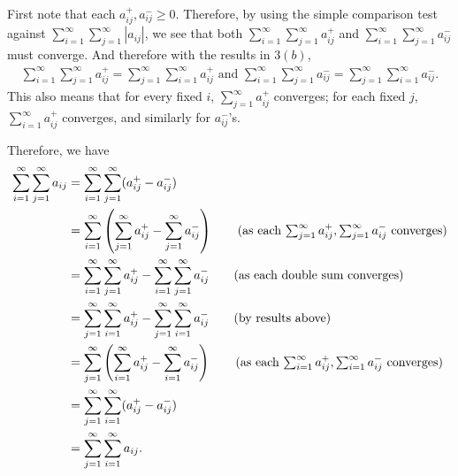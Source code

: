 \documentclass[12pt]{article}
\begin{document}
\begin{fproof}[3(c)]
 First note that each \(a_{ij}^+, a_{ij}^- \geq 0\).
 Therefore, by using the simple comparison test against \(\sum_{i=1}^{\infty} \sum_{j=1}^{\infty} |a_{ij}|\), we see that both \(\sum_{i=1}^{\infty}\sum_{j=1}^{\infty} a_{ij}^+ \) and \(\sum_{i=1}^{\infty}\sum_{j=1}^{\infty} a_{ij}^-\) must converge.
 And therefore with the results in \(3(b)\),
 \begin{align*}
    \sum_{i=1}^{\infty}\sum_{j=1}^{\infty} a_{ij}^+ = \sum_{j=1}^{\infty}\sum_{i=1}^{\infty} a_{ij}^+  
    \text{ and } 
    \sum_{i=1}^{\infty}\sum_{j=1}^{\infty} a_{ij}^- = \sum_{j=1}^{\infty}\sum_{i=1}^{\infty} a_{ij}^-.
 \end{align*}
 This also means that for every fixed \(i\), \(\sum_{j=1}^{\infty} a_{ij}^+\) converges; for each fixed \(j\), \(\sum_{i=1}^{\infty} a_{ij}^+\) converges, and similarly for \(a_{ij}^-\)'s.

 Therefore, we have
 \begin{align*}
    \sum_{i=1}^{\infty} \sum_{j=1}^{\infty} a_{ij}
    &= \sum_{i=1}^{\infty} \sum_{j=1}^{\infty} (a_{ij}^+ - a_{ij}^-)\\
    & = \sum_{i=1}^{\infty} \pare{\sum_{j=1}^{\infty} a_{ij}^+ - \sum_{j=1}^{\infty}a_{ij}^-} \tag{as each \(\sum_{j=1}^{\infty} a_{ij}^+, \sum_{j=1}^{\infty}a_{ij}^-\) converges}\\
    & = \sum_{i=1}^{\infty}\sum_{j=1}^{\infty}a_{ij}^+ -  \sum_{i=1}^{\infty}\sum_{j=1}^{\infty}a_{ij}^- \tag{as each double sum converges}\\
    & = \sum_{j=1}^{\infty}\sum_{i=1}^{\infty}a_{ij}^+ - \sum_{j=1}^{\infty}\sum_{i=1}^{\infty}a_{ij}^- \tag{by results above}\\
    &= \sum_{j=1}^{\infty} \pare{\sum_{i=1}^{\infty}a_{ij}^+ - \sum_{i=1}^{\infty}a_{ij}^-} \tag{as each \(\sum_{i=1}^{\infty} a_{ij}^+, \sum_{i=1}^{\infty}a_{ij}
    ^-\) converges}\\
    &= \sum_{j=1}^{\infty}\sum_{i=1}^{\infty} (a_{ij}^+ -a_{ij}^- )\\
    &=\sum_{j=1}^{\infty}\sum_{i=1}^{\infty} a_{ij}.
 \end{align*}
 
\end{fproof}
\newpage
\end{document}
